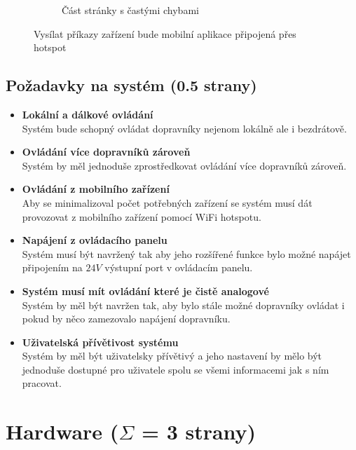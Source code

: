 \begin{figure}[H]
\begin{subfigure}[t]{0.3\textwidth}
        \caption{Část stránky s častými chybami}
        \label{fig:MobilniHelp}
    \end{subfigure}
    \caption{Vysílat příkazy zařízení bude mobilní aplikace připojená přes hotspot}
    \label{fig:MobilniAppScreenshots}
\end{figure}

\subsection{Požadavky na systém (0.5 strany)}\label{sec:PozadavkyNaSystem}
\begin{itemize}
    \item \textbf{Lokální a dálkové ovládání}\\
    Systém bude schopný ovládat dopravníky nejenom lokálně ale i bezdrátově.
    \item \textbf{Ovládání více dopravníků zároveň}\\
    Systém by měl jednoduše zprostředkovat ovládání více dopravníků zároveň.
    \item \textbf{Ovládání z mobilního zařízení}\\
    Aby se minimalizoval počet potřebných zařízení se systém musí dát provozovat z mobilního zařízení pomocí WiFi hotspotu.
    \item \textbf{Napájení z ovládacího panelu}\\
    Systém musí být navržený tak aby jeho rozšířené funkce bylo možné napájet připojením na $24V$ výstupní port v ovládacím panelu.
    \item \textbf{Systém musí mít ovládání které je čistě analogové}\\
    Systém by měl být navržen tak, aby bylo stále možné dopravníky ovládat i pokud by něco zamezovalo napájení dopravníku.
    \item \textbf{Uživatelská přívětivost systému}\\
    Systém by měl být uživatelsky přívětivý a jeho nastavení by mělo být jednoduše dostupné pro uživatele spolu se všemi informacemi jak s ním pracovat.
\end{itemize}

\section{Hardware ($\Sigma$ = 3 strany)}


